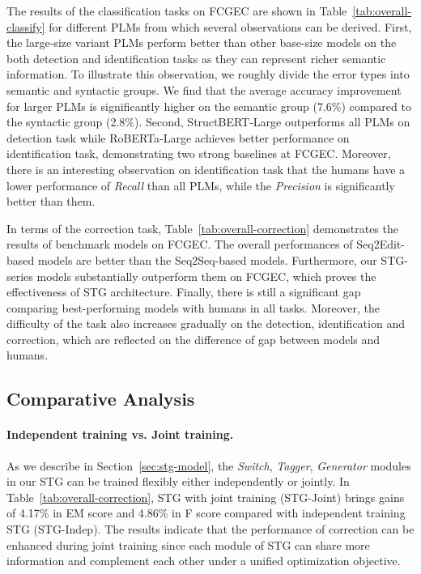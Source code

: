 \documentclass[11pt]{article}
\begin{document}
The results of the classification tasks on FCGEC are shown in Table~\ref{tab:overall-classify} for different PLMs from which several observations can be derived. First, the large-size variant PLMs perform better than other base-size models on the both detection and identification tasks as they can represent richer semantic information. To illustrate this observation, we roughly divide the error types into semantic and syntactic groups. We find that the average accuracy improvement for larger PLMs is significantly higher on the semantic group (7.6\%) compared to the syntactic group (2.8\%). Second, StructBERT-Large outperforms all PLMs on detection task while RoBERTa-Large achieves better performance on identification task, demonstrating two strong baselines at FCGEC. Moreover, there is an interesting observation on identification task that the humans have a lower performance of \emph{Recall} than all PLMs, while the \emph{Precision} is significantly better than them.

In terms of the correction task, Table~\ref{tab:overall-correction} demonstrates the results of benchmark models on FCGEC. The overall performances of Seq2Edit-based models are better than the Seq2Seq-based models. Furthermore, our STG-series models substantially outperform them on FCGEC, which proves the effectiveness of STG architecture. Finally, there is still a significant gap comparing best-performing models with humans in all tasks. Moreover, the difficulty of the task also increases gradually on the detection, identification and correction, which are reflected on the difference of gap between models and humans.



\subsection{Comparative Analysis}

\paragraph{Independent training vs. Joint training.} As we describe in Section~\ref{sec:stg-model}, the \emph{Switch}, \emph{Tagger}, \emph{Generator} modules in our STG can be trained flexibly either independently or jointly. In Table~\ref{tab:overall-correction}, STG with joint training (STG-Joint) brings gains of 4.17\% in EM score and 4.86\% in F score compared with independent training STG (STG-Indep). The results indicate that the performance of correction can be enhanced during joint training since each module of STG can share more information and complement each other under a unified optimization objective. 
\end{document}
